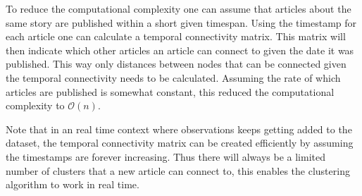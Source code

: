 To reduce the computational complexity one can assume that articles about the same story are published within a short given timespan. Using the timestamp for each article one can calculate a temporal connectivity matrix. This matrix will then indicate which other articles an article can connect to given the date it was published. This way only distances between nodes that can be connected given the temporal connectivity needs to be calculated. Assuming the rate of which articles are published is somewhat constant, this reduced the computational complexity to $\mathcal{O}(n)$.

Note that in an real time context where observations keeps getting added to the dataset, the temporal connectivity matrix can be created efficiently by assuming the timestamps are forever increasing. Thus there will always be a limited number of clusters that a new article can connect to, this enables the clustering algorithm to work in real time.
